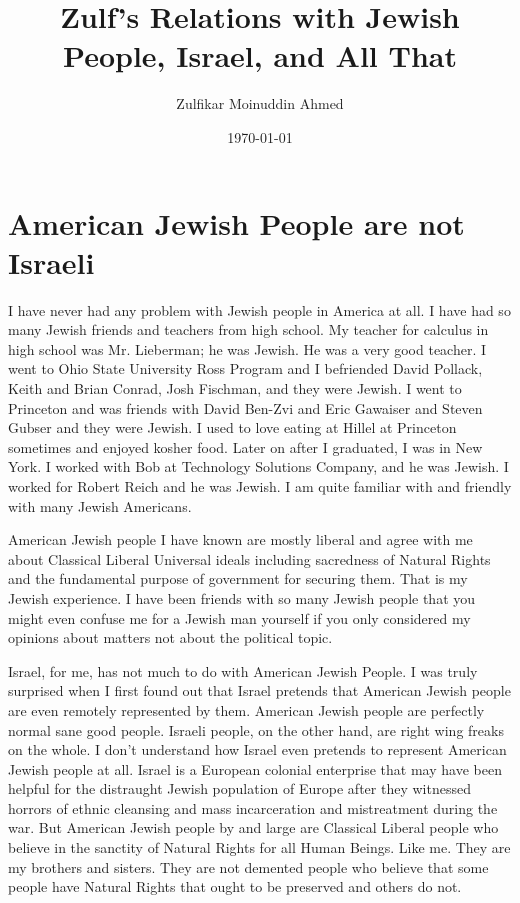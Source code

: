 \documentclass{amsart}
\title{Zulf's Relations with Jewish People, Israel, and All That}
\author{Zulfikar Moinuddin Ahmed}
\date{\today}
\begin{document}
\maketitle

\section{American Jewish People are not Israeli}

I have never had any problem with Jewish people in America at all.  I have had so many Jewish friends and teachers from high school.  My teacher for calculus in high school was Mr. Lieberman; he was Jewish.  He was a very good teacher.  I went to Ohio State University Ross Program and I befriended David Pollack, Keith and Brian Conrad, Josh Fischman, and they were Jewish.  I went to Princeton and was friends with David Ben-Zvi and Eric Gawaiser and Steven Gubser and they were Jewish.  I used to love eating at Hillel at Princeton sometimes and enjoyed kosher food.  Later on after I graduated, I was in New York.  I worked with Bob at Technology Solutions Company, and he was Jewish.  I worked for Robert Reich and he was Jewish.  I am quite familiar with and friendly with many Jewish Americans.  

American Jewish people I have known are mostly liberal and agree with me about Classical Liberal Universal ideals including sacredness of Natural Rights and the fundamental purpose of government for securing them.  That is my Jewish experience.  I have been friends with so many Jewish people that you might even confuse me for a Jewish man yourself if you only considered my opinions about matters not about the political topic.  

Israel, for me, has not much to do with American Jewish People.  I was truly surprised when I first found out that Israel pretends that American Jewish people are even remotely represented by them.  American Jewish people are perfectly normal sane good people.  Israeli people, on the other hand, are right wing freaks on the whole.  I don't understand how Israel even pretends to represent American Jewish people at all.  Israel is a European colonial enterprise that may have been helpful for the distraught Jewish population of Europe after they witnessed horrors of ethnic cleansing and mass incarceration and mistreatment during the war.  But American Jewish people by and large are Classical Liberal people who believe in the sanctity of Natural Rights for all Human Beings.  Like me.  They are my brothers and sisters.  They are not demented people who believe that some people have Natural Rights that ought to be preserved and others do not.
\end{document}
